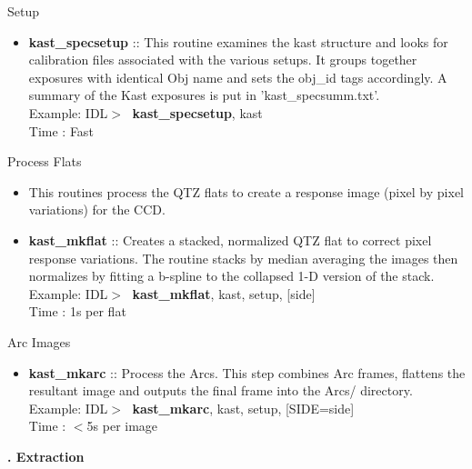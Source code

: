 \documentclass[11pt,letterpaper,dvips]{article}
\begin{document}
\begin{enumerate}
{\Large    \item Setup }
	\begin{itemize}
	  \item {\bf kast\_specsetup} ::
	This routine examines the kast structure and looks for calibration
	files associated with the various setups.
	It groups together exposures with identical Obj name and 
	sets the obj\_id tags accordingly.
	A summary of the Kast exposures is put in 'kast\_specsumm.txt'. \\
         \quad Example: IDL$> \;$ {\bf kast\_specsetup}, kast \\
         \quad Time   : Fast
	\end{itemize}


{\Large  \item Process Flats }
  \begin{itemize}
	\item This routines process the QTZ flats to create a 
	response image (pixel by pixel variations) for the CCD.

	\item {\bf kast\_mkflat} :: Creates a stacked, normalized QTZ flat 
	to correct pixel response variations.  
	The routine stacks by median averaging the images then normalizes
	by fitting a b-spline to the collapsed 1-D version of the stack. \\
         \quad Example: IDL$> \;$ {\bf kast\_mkflat}, kast, setup, [side]\\
         \quad Time   : 1s per flat 


  \end{itemize}

{\Large  \item Arc Images }
  \begin{itemize}
	\item {\bf kast\_mkarc} :: Process the Arcs.  
	This step combines Arc frames, flattens the resultant image and outputs
 	the final frame into the Arcs/ directory.  \\
         \quad Example: IDL$> \;$ {\bf kast\_mkarc}, kast, setup, [SIDE=side] \\
         \quad Time   : $<$5s per image


  \end{itemize}

\end{enumerate}

\clearpage

\begin{center}
{\Huge {\bf {}. Extraction}}
\end{center}
\end{document}
